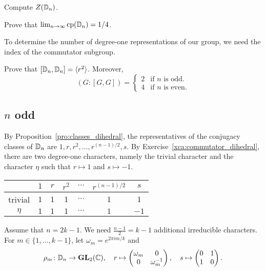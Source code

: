 \begin{exercise}
\label{xca:center_dihedral}
    Compute $Z(\mathbb{D}_n)$. 
\end{exercise}

\begin{exercise}
\label{xca:cp_dihedral}
    Prove that $\lim_{n\to\infty}\operatorname{cp}(\mathbb{D}_{n})=1/4$.
\end{exercise}

To determine the number of degree-one representations of our group, 
we need the index of the commutator subgroup.

\begin{exercise}
\label{xca:commutator_dihedral}
    Prove that $[\mathbb{D}_n,\mathbb{D}_n]=\langle r^2\rangle$. Moreover, 
    \[
    (G:[G,G])=\begin{cases}
        2 & \text{if $n$ is odd.}\\
        4 & \text{if $n$ is even.}
    \end{cases}
    \]
\end{exercise}

\subsection{$n$ odd}

By Proposition~\ref{pro:classes_dihedral}, the representatives of the conjugacy classes of $\mathbb{D}_n$ are 
$1,r,r^2,\dots,r^{(n-1)/2},s$. 
By Exercise~\ref{xca:commutator_dihedral}, there are two degree-one characters, namely the trivial character 
and the character $\eta$ such that $r\mapsto 1$ and $s\mapsto -1$. 

\bigskip 
\begin{center}
    \begin{tabular}{|c|cccccc|}
         \hline 
         & $1$ & $r$ & $r^2$ & $\cdots$  & $r^{(n-1)/2}$ & $s$\\
         \hline 
         trivial & $1$ & $1$ & $1$ & $\cdots$ & $1$ & $1$\\
         $\eta$ & $1$ & $1$ & $1$ & $\cdots$ & $1$ & $-1$\\
         \hline 
    \end{tabular}
\end{center}
\bigskip 

Assume that $n=2k-1$. 
We need $\frac{n-1}{2}=k-1$ additional irreducible characters.
For $m\in\{1,\dots,k-1\}$, let $\omega_m=e^{2\pi im/k}$ and 
\[
\rho_m\colon\mathbb{D}_n\to\mathbf{GL}_2(\mathbb{C}),\quad 
r\mapsto\begin{pmatrix}\omega_m&0\\0&\omega_m^{-1}\end{pmatrix},\quad 
s\mapsto\begin{pmatrix}0&1\\1&0\end{pmatrix}.
\]

